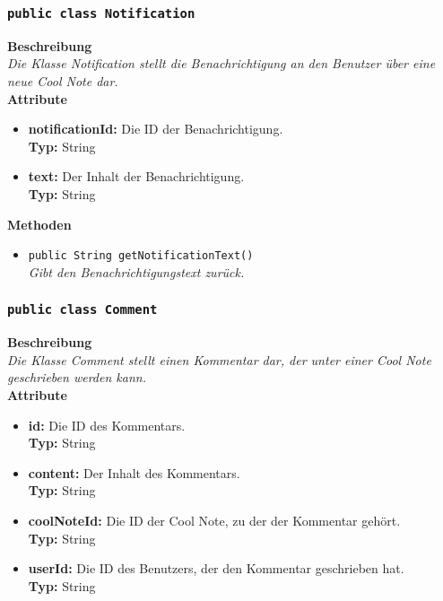 \subsubsection{\texttt{public class Notification}}

	\textbf{Beschreibung} \\
	\textit{Die Klasse Notification stellt die Benachrichtigung an den Benutzer über eine neue Cool Note dar.} \\
	
	\textbf{Attribute}
	\begin{itemize}
		\item \textbf{notificationId:} Die ID der Benachrichtigung. \\
		\textbf{Typ:} String
		\item \textbf{text:} Der Inhalt der Benachrichtigung. \\
		\textbf{Typ:} String
	\end{itemize}
	
	\textbf{Methoden}
	\begin{itemize}
		\item\texttt{{public String getNotificationText()}}\\
		\textit{Gibt den Benachrichtigungstext zurück.}\\
	\end{itemize}

\subsubsection{\texttt{public class Comment}}

	\textbf{Beschreibung} \\
	\textit{Die Klasse Comment stellt einen Kommentar dar, der unter einer Cool Note geschrieben werden kann.} \\
	
	\textbf{Attribute}
	\begin{itemize}
		\item \textbf{id:} Die ID des Kommentars. \\
		\textbf{Typ:} String
		\item \textbf{content:} Der Inhalt des Kommentars. \\
		\textbf{Typ:} String
		\item \textbf{coolNoteId:} Die ID der Cool Note, zu der der Kommentar gehört. \\
		\textbf{Typ:} String
		\item \textbf{userId:} Die ID des Benutzers, der den Kommentar geschrieben hat.\\
		\textbf{Typ:} String
	\end{itemize}
	
